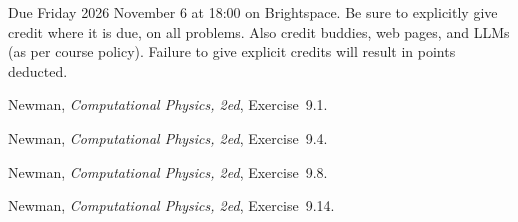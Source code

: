\documentclass[12pt]{article}
\begin{document}
Due Friday 2026 November 6 at 18:00 on Brightspace.
Be sure to explicitly give credit where it is due, on all problems.
Also credit buddies, web pages, and LLMs (as per course policy).
Failure to give explicit credits will result in points deducted.

\begin{problem}
  Newman, \textit{Computational Physics, 2ed}, Exercise~9.1.
\end{problem}

\begin{problem}
  Newman, \textit{Computational Physics, 2ed}, Exercise~9.4.
\end{problem}

\begin{problem}
  Newman, \textit{Computational Physics, 2ed}, Exercise~9.8.
\end{problem}

\begin{problem}
  Newman, \textit{Computational Physics, 2ed}, Exercise~9.14.
\end{problem}
\end{document}
